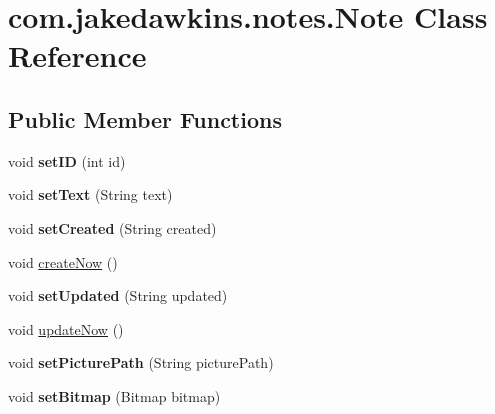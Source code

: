 \hypertarget{classcom_1_1jakedawkins_1_1notes_1_1_note}{}\section{com.\+jakedawkins.\+notes.\+Note Class Reference}
\label{classcom_1_1jakedawkins_1_1notes_1_1_note}
\subsection*{Public Member Functions}
\begin{DoxyCompactItemize}
\item 
void {\bfseries set\+ID} (int id)\hypertarget{classcom_1_1jakedawkins_1_1notes_1_1_note_a876432b6d8ebdefe19913e56e25a7f55}{}\label{classcom_1_1jakedawkins_1_1notes_1_1_note_a876432b6d8ebdefe19913e56e25a7f55}

\item 
void {\bfseries set\+Text} (String text)\hypertarget{classcom_1_1jakedawkins_1_1notes_1_1_note_ac1e2f35722960be015d567988bee7ae8}{}\label{classcom_1_1jakedawkins_1_1notes_1_1_note_ac1e2f35722960be015d567988bee7ae8}

\item 
void {\bfseries set\+Created} (String created)\hypertarget{classcom_1_1jakedawkins_1_1notes_1_1_note_a09b6be123b9c33bc1232bb2f3fd095c3}{}\label{classcom_1_1jakedawkins_1_1notes_1_1_note_a09b6be123b9c33bc1232bb2f3fd095c3}

\item 
void \hyperlink{classcom_1_1jakedawkins_1_1notes_1_1_note_a3c1aa05b41c222b6225c4c17c27f2b6a}{create\+Now} ()
\item 
void {\bfseries set\+Updated} (String updated)\hypertarget{classcom_1_1jakedawkins_1_1notes_1_1_note_a64f269e798088cfbcd478706b740e876}{}\label{classcom_1_1jakedawkins_1_1notes_1_1_note_a64f269e798088cfbcd478706b740e876}

\item 
void \hyperlink{classcom_1_1jakedawkins_1_1notes_1_1_note_a244c89c05ab7d2664d648cf111ae994c}{update\+Now} ()
\item 
void {\bfseries set\+Picture\+Path} (String picture\+Path)\hypertarget{classcom_1_1jakedawkins_1_1notes_1_1_note_acd7617ca0900f38eadf1e53dfcb11050}{}\label{classcom_1_1jakedawkins_1_1notes_1_1_note_acd7617ca0900f38eadf1e53dfcb11050}

\item 
void {\bfseries set\+Bitmap} (Bitmap bitmap)\hypertarget{classcom_1_1jakedawkins_1_1notes_1_1_note_aba7f2ef5b4b55a924d4fab74a90dbf5a}{}\label{classcom_1_1jakedawkins_1_1notes_1_1_note_aba7f2ef5b4b55a924d4fab74a90dbf5a}


\end{DoxyCompactItemize}
